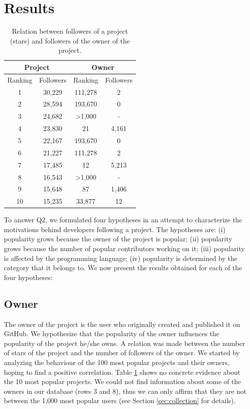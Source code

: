 
\section{Results}
\begin{table}
\centering
\begin{tabular}{ | c | c | c | c | }
	\hline
	\multicolumn{2}{|c|}{Project} & \multicolumn{2}{|c|}{Owner} \\ \hline
	Ranking & Followers & Ranking & Followers \\ \hline
	1 & 30,229 & 111,278 & 2 \\ \hline
	2 & 28,594 & 193,670 & 0 \\ \hline
	3 & 24,682 & >1,000 & -  \\ \hline
	4 & 23,830 & 21 & 4,161 \\ \hline
	5 & 22,167 & 193,670 & 0 \\ \hline
	6 & 21,227 & 111,278 & 2 \\ \hline
	7 & 17,485 & 12 & 5,213 \\ \hline
	8 & 16,543 & >1,000 & - \\ \hline
	9 & 15,648 & 87 & 1,406 \\ \hline
	10 & 15,235 & 33,877 & 12 \\ \hline
\end{tabular}
\caption{Relation between followers of a project (stars) and followers of the owner of the project. }
\label{tbl:owner}
\end{table}
\label{sec:results}

To answer Q2, we formulated four hypotheses in an attempt to characterize the motivations behind developers following a project. The hypotheses are: (i) popularity grows because the owner of the project is popular; (ii) popularity grows because the number of popular contributors working on it; (iii) popularity is affected by the programming language; (iv) popularity is determined by the category that it belongs to. We now present the results obtained for each of the four hypotheses:

\subsection{Owner}

The owner of the project is the user who originally created and published it on GitHub. We hypothesize that the popularity of the owner influences the popularity of the project he/she owns. A relation was made between the number of stars of the project and the number of followers of the owner. We started by analyzing the behaviour of the 100 most popular projects and their owners, hoping to find a positive correlation. Table \ref{tbl:owner} shows no concrete evidence about the 10 most popular projects. We could not find information about some of the owners in our database (rows 3 and 8), thus we can only affirm that they are not between the 1,000 most popular users (see Section \ref{sec:collection} for details).

